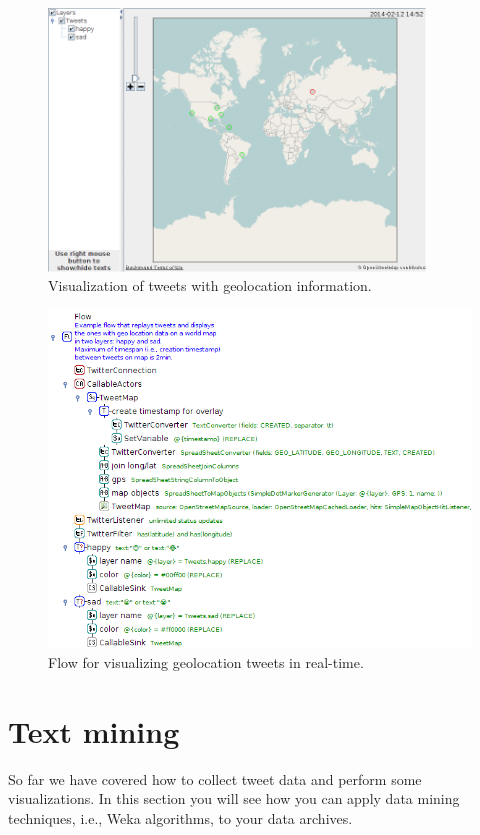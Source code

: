 \documentclass[a4paper,10pt]{book}
\begin{document}
\begin{figure}[htb]
  \centering
  \includegraphics[width=10.0cm]{images/visualize_tweets-archive-output.png}
  \caption{Visualization of tweets with geolocation information.}
  \label{visualize_tweets-archive-output}
\end{figure}

\begin{figure}[htb]
  \centering
  \includegraphics[width=12.0cm]{images/visualize_tweets-realtime-flow.png}
  \caption{Flow for visualizing geolocation tweets in real-time.}
  \label{visualize_tweets-realtime-flow}
\end{figure}

\clearpage
\newpage
\section{Text mining}
So far we have covered how to collect tweet data and perform some visualizations. In this section you will see how you can apply data mining techniques, i.e., Weka\cite{weka} algorithms, to your data archives.
\end{document}
